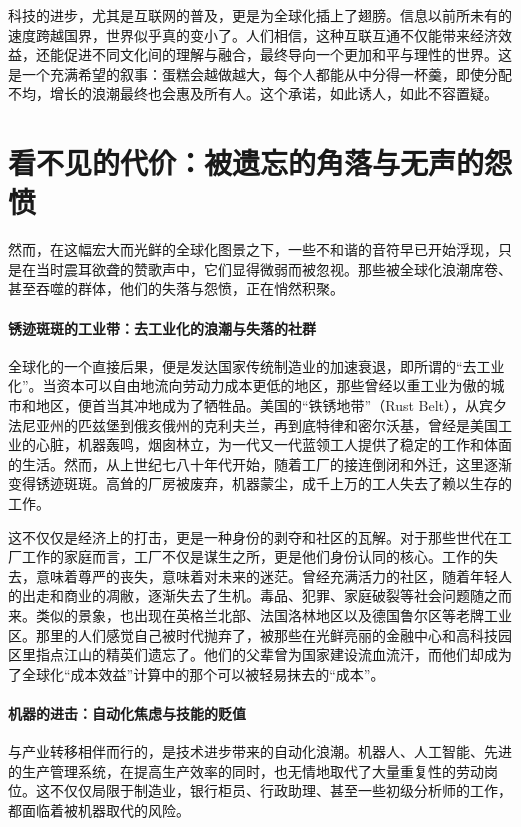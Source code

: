 科技的进步，尤其是互联网的普及，更是为全球化插上了翅膀。信息以前所未有的速度跨越国界，世界似乎真的变小了。人们相信，这种互联互通不仅能带来经济效益，还能促进不同文化间的理解与融合，最终导向一个更加和平与理性的世界。这是一个充满希望的叙事：蛋糕会越做越大，每个人都能从中分得一杯羹，即使分配不均，增长的浪潮最终也会惠及所有人。这个承诺，如此诱人，如此不容置疑。

\section{看不见的代价：被遗忘的角落与无声的怨愤}

然而，在这幅宏大而光鲜的全球化图景之下，一些不和谐的音符早已开始浮现，只是在当时震耳欲聋的赞歌声中，它们显得微弱而被忽视。那些被全球化浪潮席卷、甚至吞噬的群体，他们的失落与怨愤，正在悄然积聚。

\paragraph*{锈迹斑斑的工业带：去工业化的浪潮与失落的社群}

全球化的一个直接后果，便是发达国家传统制造业的加速衰退，即所谓的“去工业化”。当资本可以自由地流向劳动力成本更低的地区，那些曾经以重工业为傲的城市和地区，便首当其冲地成为了牺牲品。美国的“铁锈地带”（Rust Belt），从宾夕法尼亚州的匹兹堡到俄亥俄州的克利夫兰，再到底特律和密尔沃基，曾经是美国工业的心脏，机器轰鸣，烟囱林立，为一代又一代蓝领工人提供了稳定的工作和体面的生活。然而，从上世纪七八十年代开始，随着工厂的接连倒闭和外迁，这里逐渐变得锈迹斑斑。高耸的厂房被废弃，机器蒙尘，成千上万的工人失去了赖以生存的工作。

这不仅仅是经济上的打击，更是一种身份的剥夺和社区的瓦解。对于那些世代在工厂工作的家庭而言，工厂不仅是谋生之所，更是他们身份认同的核心。工作的失去，意味着尊严的丧失，意味着对未来的迷茫。曾经充满活力的社区，随着年轻人的出走和商业的凋敝，逐渐失去了生机。毒品、犯罪、家庭破裂等社会问题随之而来。类似的景象，也出现在英格兰北部、法国洛林地区以及德国鲁尔区等老牌工业区。那里的人们感觉自己被时代抛弃了，被那些在光鲜亮丽的金融中心和高科技园区里指点江山的精英们遗忘了。他们的父辈曾为国家建设流血流汗，而他们却成为了全球化“成本效益”计算中的那个可以被轻易抹去的“成本”。

\paragraph*{机器的进击：自动化焦虑与技能的贬值}

与产业转移相伴而行的，是技术进步带来的自动化浪潮。机器人、人工智能、先进的生产管理系统，在提高生产效率的同时，也无情地取代了大量重复性的劳动岗位。这不仅仅局限于制造业，银行柜员、行政助理、甚至一些初级分析师的工作，都面临着被机器取代的风险。

